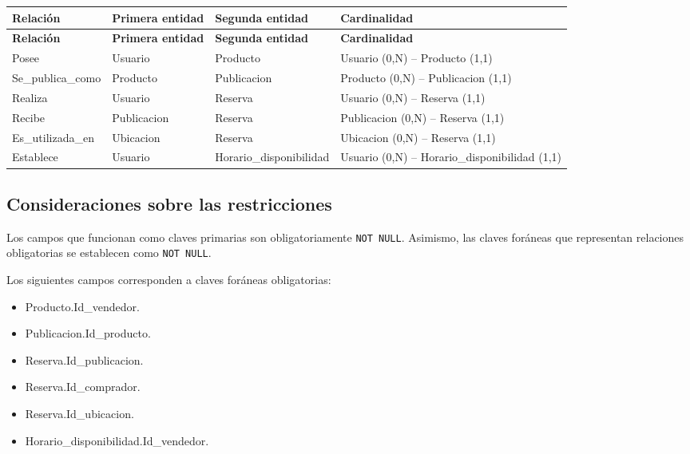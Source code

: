 \documentclass[12pt]{article} %
\begin{document}
\begin{longtable}{>{\raggedright\arraybackslash}p{3.5cm}
                  >{\raggedright\arraybackslash}p{3.5cm}
                  >{\raggedright\arraybackslash}p{4.0cm}
                  >{\raggedright\arraybackslash}p{4.0cm}}
\toprule
\textbf{Relación} &
\textbf{Primera entidad} &
\textbf{Segunda entidad} &
\textbf{Cardinalidad} \\
\midrule
\endfirsthead

\toprule
\textbf{Relación} &
\textbf{Primera entidad} &
\textbf{Segunda entidad} &
\textbf{Cardinalidad} \\
\midrule
\endhead

Posee &
Usuario &
Producto &
Usuario (0,N) -- Producto (1,1) \\

Se\_publica\_como &
Producto &
Publicacion &
Producto (0,N) -- Publicacion (1,1) \\

Realiza &
Usuario &
Reserva &
Usuario (0,N) -- Reserva (1,1) \\

Recibe &
Publicacion &
Reserva &
Publicacion (0,N) -- Reserva (1,1) \\

Es\_utilizada\_en &
Ubicacion &
Reserva &
Ubicacion (0,N) -- Reserva (1,1) \\

Establece &
Usuario &
Horario\_disponibilidad &
Usuario (0,N) -- Horario\_disponibilidad (1,1) \\

\bottomrule
\end{longtable}



\subsection{Consideraciones sobre las restricciones}

Los campos que funcionan como claves primarias son obligatoriamente
\texttt{NOT NULL}. Asimismo, las claves foráneas que representan
relaciones obligatorias se establecen como \texttt{NOT NULL}.

Los siguientes campos corresponden a claves foráneas obligatorias:

\begin{itemize}
    \item Producto.Id\_vendedor.
    \item Publicacion.Id\_producto.
    \item Reserva.Id\_publicacion.
    \item Reserva.Id\_comprador.
    \item Reserva.Id\_ubicacion.
    \item Horario\_disponibilidad.Id\_vendedor.
\end{itemize}
\end{document}
